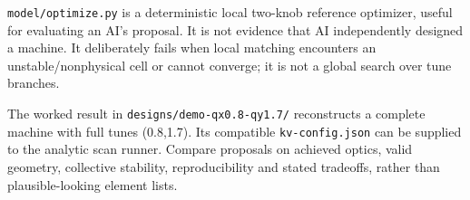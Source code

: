 \documentclass[
  11pt,
  a4paper,
]{article}
\begin{document}
\texttt{model/optimize.py} is a deterministic local two-knob reference
optimizer, useful for evaluating an AI's proposal. It is not evidence
that AI independently designed a machine. It deliberately fails when
local matching encounters an unstable/nonphysical cell or cannot
converge; it is not a global search over tune branches.

The worked result in \texttt{designs/demo-qx0.8-qy1.7/} reconstructs a
complete machine with full tunes (0.8,1.7). Its compatible
\texttt{kv-config.json} can be supplied to the analytic scan runner.
Compare proposals on achieved optics, valid geometry, collective
stability, reproducibility and stated tradeoffs, rather than
plausible-looking element lists.
\end{document}

